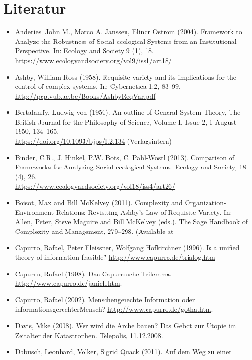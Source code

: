 \documentclass[11pt,a4paper]{article}
\begin{document}
\section{Literatur}

\begin{itemize}
\item Anderies, John M., Marco A. Janssen, Elinor Ostrom (2004).  Framework to
  Analyze the Robustness of Social-ecological Systems from an Institutional
  Perspective. In: Ecology and Society 9 (1), 18.\\
  \url{https://www.ecologyandsociety.org/vol9/iss1/art18/}
\item Ashby, William Ross (1958).  Requisite variety and its implications for
  the control of complex systems. In: Cybernetica 1:2, 83--99.\\
  \url{http://pcp.vub.ac.be/Books/AshbyReqVar.pdf}
\item Bertalanffy, Ludwig von (1950). An outline of General System Theory,
  The British Journal for the Philosophy of Science, Volume I, Issue 2, 1
  August 1950, 134–165.\\ \url{https://doi.org/10.1093/bjps/I.2.134}
  (Verlagsintern) 
\item Binder, C.R., J. Hinkel, P.W. Bots, C. Pahl-Wostl (2013). Comparison of
  Frameworks for Analyzing Social-ecological Systems. Ecology and Society,
  18 (4), 26.\\ \url{https://www.ecologyandsociety.org/vol18/iss4/art26/}
\item Boisot, Max and Bill McKelvey (2011). Complexity and
  Organization-Environment Relations: Revisiting Ashby’s Law of Requisite
  Variety. In: Allen, Peter, Steve Maguire and Bill McKelvey (eds.). The Sage
  Handbook of Complexity and Management, 279--298. (Available at
\item Capurro, Rafael, Peter Fleissner, Wolfgang Hofkirchner (1996). Is a
  unified theory of information feasible?
  \url{http://www.capurro.de/trialog.htm}
\item Capurro, Rafael (1998). Das Capurrosche Trilemma.
  \url{http://www.capurro.de/janich.htm}.
\item Capurro, Rafael (2002). Menschengerechte Information oder
  informationsgerechter\linebreak Mensch?
  \url{http://www.capurro.de/gotha.htm}.
\item Davis, Mike (2008). Wer wird die Arche bauen?  Das Gebot zur Utopie im
  Zeitalter der Katastrophen.  Telepolis, 11.12.2008.
\item Dobusch, Leonhard, Volker, Sigrid Quack (2011). Auf dem Weg zu einer

\end{itemize}
\end{document}

